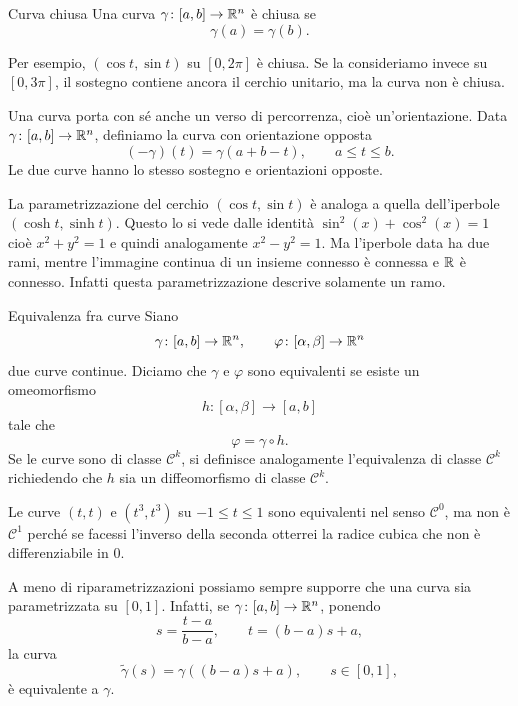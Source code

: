 \documentclass[a4paper]{article}
\begin{document}
\begin{snippetdefinition}{Curva chiusa}
    Una curva \(\gamma\colon[a,b]\to\mathbb{R}^n\) è chiusa se
    \[
        \gamma(a)=\gamma(b).
    \]
\end{snippetdefinition}

Per esempio, \((\cos t,\sin t)\) su \([0,2\pi]\) è chiusa. Se la consideriamo invece
su \([0,3\pi]\), il sostegno contiene ancora il cerchio unitario, ma la curva non è chiusa.

Una curva porta con sé anche un verso di percorrenza, cioè un'orientazione. Data
\(\gamma\colon[a,b]\to\mathbb{R}^n\), definiamo la curva con orientazione opposta
\[
    (-\gamma)(t)=\gamma(a+b-t),
    \qquad a\leq t\leq b.
\]
Le due curve hanno lo stesso sostegno e orientazioni opposte.

La parametrizzazione del cerchio \((\cos t, \sin t)\)
è analoga a quella dell'iperbole \((\cosh t, \sinh t)\).
Questo lo si vede dalle identità \(\sin^2(x) + \cos^2(x) = 1\)
cioè \(x^2 + y^2 = 1\) e quindi analogamente \(x^2 - y^2 = 1\).
Ma l'iperbole data ha due rami, mentre l'immagine continua di un insieme connesso è connessa e \(\mathbb{R}\) è connesso.
Infatti questa parametrizzazione descrive solamente un ramo.

\begin{snippetdefinition}{Equivalenza fra curve}
    Siano
    \[
        \gamma\colon[a,b]\to\mathbb{R}^n,
        \qquad
        \varphi\colon[\alpha,\beta]\to\mathbb{R}^n
    \]
    due curve continue. Diciamo che \(\gamma\) e \(\varphi\) sono equivalenti se esiste
    un omeomorfismo
    \[
        h\colon[\alpha,\beta]\to[a,b]
    \]
    tale che
    \[
        \varphi=\gamma\circ h.
    \]
    Se le curve sono di classe \(\mathcal{C}^k\), si definisce analogamente l'equivalenza
    di classe \(\mathcal{C}^k\) richiedendo che \(h\) sia un diffeomorfismo di classe \(\mathcal{C}^k\).
\end{snippetdefinition}

\begin{snippetexample}{}
    Le curve \((t,t)\) e \((t^3, t^3)\)
    su \(-1 \leq t \leq 1\) sono equivalenti nel senso \(\mathcal{C}^0\),
    ma non è \(\mathcal{C}^1\) perché se facessi l'inverso della seconda otterrei la radice cubica che non è differenziabile in 0.
\end{snippetexample}

A meno di riparametrizzazioni possiamo sempre supporre che una curva sia parametrizzata su \([0,1]\).
Infatti, se \(\gamma\colon[a,b]\to\mathbb{R}^n\), ponendo
\[
    s=\frac{t-a}{b-a},
    \qquad
    t=(b-a)s+a,
\]
la curva
\[
    \widetilde\gamma(s)=\gamma((b-a)s+a),
    \qquad s\in[0,1],
\]
è equivalente a \(\gamma\).
\end{document}
